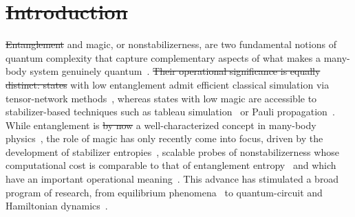 \documentclass[aps,prl,twocolumn,superscriptaddress,reprint,longbibliography,nofootinbib]{revtex4-2}
\providecommand{\DIFaddtex}[1]{{\protect\color{blue}\uwave{#1}}} %
\providecommand{\DIFdeltex}[1]{{\protect\color{red}\sout{#1}}}                      %
\providecommand{\DIFaddbegin}{} %
\providecommand{\DIFaddend}{} %
\providecommand{\DIFdelbegin}{} %
\providecommand{\DIFdelend}{} %
\providecommand{\DIFadd}[1]{\texorpdfstring{\DIFaddtex{#1}}{#1}} %
\providecommand{\DIFdel}[1]{\texorpdfstring{\DIFdeltex{#1}}{}} %
\newcommand{\DIFscaledelfig}{0.5}
\newlength{\DIFdelgraphicswidth} %
\newlength{\DIFdelgraphicsheight} %
\newcommand{\DIFaddincludegraphics}[2][]{{\color{blue}\fbox{\DIFOincludegraphics[#1]{#2}}}} %
\newcommand{\DIFdelincludegraphics}[2][]{%
\sbox{\DIFdelgraphicsbox}{\DIFOincludegraphics[#1]{#2}}%
\settoboxwidth{\DIFdelgraphicswidth}{\DIFdelgraphicsbox} %
\settoboxtotalheight{\DIFdelgraphicsheight}{\DIFdelgraphicsbox} %
\scalebox{\DIFscaledelfig}{%
\parbox[b]{\DIFdelgraphicswidth}{\usebox{\DIFdelgraphicsbox}\\[-\baselineskip] \rule{\DIFdelgraphicswidth}{0em}}\llap{\resizebox{\DIFdelgraphicswidth}{\DIFdelgraphicsheight}{%
\setlength{\unitlength}{\DIFdelgraphicswidth}%
\begin{picture}(1,1)%
\thicklines\linethickness{2pt} %
{\color[rgb]{1,0,0}\put(0,0){\framebox(1,1){}}}%
{\color[rgb]{1,0,0}\put(0,0){\line( 1,1){1}}}%
{\color[rgb]{1,0,0}\put(0,1){\line(1,-1){1}}}%
\end{picture}%
}\hspace*{3pt}}} %
} %
\DeclareRobustCommand{\DIFaddbegin}{\DIFOaddbegin \let\includegraphics\DIFaddincludegraphics} %
\DeclareRobustCommand{\DIFaddend}{\DIFOaddend \let\includegraphics\DIFOincludegraphics} %
\DeclareRobustCommand{\DIFdelbegin}{\DIFOdelbegin \let\includegraphics\DIFdelincludegraphics} %
\DeclareRobustCommand{\DIFdelend}{\DIFOaddend \let\includegraphics\DIFOincludegraphics} %
\begin{document}
\DIFdelbegin \section{\DIFdel{Introduction}}
\addtocounter{section}{-1}%

\DIFdel{Entanglement }\DIFdelend \DIFaddbegin \textbf{\DIFadd{Introduction.}}\DIFadd{---Entanglement }\DIFaddend and magic, or nonstabilizerness, are two fundamental notions of quantum complexity that capture complementary aspects of what makes a many-body system genuinely quantum~\cite{Horodecki2009,Chitambar2019resources,Veitch2014resource}.
\DIFdelbegin \DIFdel{Their operational significance is equally distinct: states }\DIFdelend \DIFaddbegin \DIFadd{States }\DIFaddend with low entanglement admit efficient classical simulation via tensor-network methods~\cite{Schollw_ck_2011}, whereas states with low magic are accessible to stabilizer-based techniques such as tableau simulation~\cite{Gottesman1998,Bravyi2019simulationofquantum} or Pauli propagation~\cite{dowling2025magic,rudolph2025paulipropagationcomputationalframework}.
While entanglement is \DIFdelbegin \DIFdel{by now }\DIFdelend a well-characterized concept in many-body physics~\cite{Laflorencie_2016,amico2008entanglement}, the role of magic has only recently come into focus, driven by the development of stabilizer entropies~\cite{Leone2022SRE,leone2024stabilizer}, scalable probes of nonstabilizerness whose computational cost is comparable to that of entanglement entropy~\cite{huang2026fastexactapproachstabilizer,xiao2026exponentiallyacceleratedsamplingpauli,sierant2026computingquantummagicstate} and which have an important operational meaning~\cite{Bittel_2026, Iannotti_2026, cusumano2025nonstabilizernessviolationschshinequalities}.
This advance has stimulated a broad program of research, from equilibrium phenomena~\cite{piro2,tarabunga2023manybody,oshino2026stabilizer,hoshino2025stabilizerrenyientropyencodes, aditya2025mpembaeffectsquantumcomplexity} to quantum-circuit and Hamiltonian dynamics~\cite{Turkeshi_2025,odavic2025stabilizer,tirrito2025anticoncentration,falcao2025nonstabilizerness, PhysRevB.106.214316, p8dn-glcw, lio2026quantumstatedesignsmagic, aditya2025growthspreadingquantumresources, Viscardi_2026}.
\end{document}
